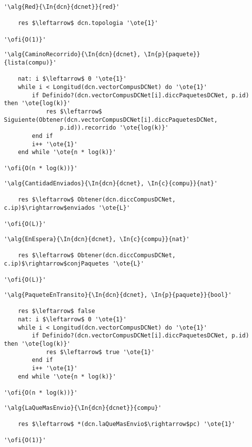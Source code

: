 \begin{lstlisting}[mathescape]
'\alg{Red}{\In{dcn}{dcnet}}{red}'

	res $\leftarrow$ dcn.topologia '\ote{1}'

'\ofi{O(1)}'
\end{lstlisting}

\begin{lstlisting}[mathescape]
'\alg{CaminoRecorrido}{\In{dcn}{dcnet}, \In{p}{paquete}}{lista(compu)}'

	nat: i $\leftarrow$ 0 '\ote{1}'
	while i < Longitud(dcn.vectorCompusDCNet) do '\ote{1}'
		if Definido?(dcn.vectorCompusDCNet[i].diccPaquetesDCNet, p.id) then '\ote{log(k)}'
			res $\leftarrow$ Siguiente(Obtener(dcn.vectorCompusDCNet[i].diccPaquetesDCNet,
				p.id)).recorrido '\ote{log(k)}'
		end if
		i++ '\ote{1}'
	end while '\ote{n * log(k)}'

'\ofi{O(n * log(k))}'
\end{lstlisting}

\begin{lstlisting}[mathescape]
'\alg{CantidadEnviados}{\In{dcn}{dcnet}, \In{c}{compu}}{nat}'

	res $\leftarrow$ Obtener(dcn.diccCompusDCNet, c.ip)$\rightarrow$enviados '\ote{L}'

'\ofi{O(L)}'
\end{lstlisting}

\begin{lstlisting}[mathescape]
'\alg{EnEspera}{\In{dcn}{dcnet}, \In{c}{compu}}{nat}'

	res $\leftarrow$ Obtener(dcn.diccCompusDCNet, c.ip)$\rightarrow$conjPaquetes '\ote{L}'

'\ofi{O(L)}'
\end{lstlisting}

\begin{lstlisting}[mathescape]
'\alg{PaqueteEnTransito}{\In{dcn}{dcnet}, \In{p}{paquete}}{bool}'

	res $\leftarrow$ false
	nat: i $\leftarrow$ 0 '\ote{1}'
	while i < Longitud(dcn.vectorCompusDCNet) do '\ote{1}'
		if Definido?(dcn.vectorCompusDCNet[i].diccPaquetesDCNet, p.id) then '\ote{log(k)}'
			res $\leftarrow$ true '\ote{1}'
		end if
		i++ '\ote{1}'
	end while '\ote{n * log(k)}'

'\ofi{O(n * log(k))}'
\end{lstlisting}

\begin{lstlisting}[mathescape]
'\alg{LaQueMasEnvio}{\In{dcn}{dcnet}}{compu}'

	res $\leftarrow$ *(dcn.laQueMasEnvio$\rightarrow$pc) '\ote{1}'

'\ofi{O(1)}'
\end{lstlisting}

